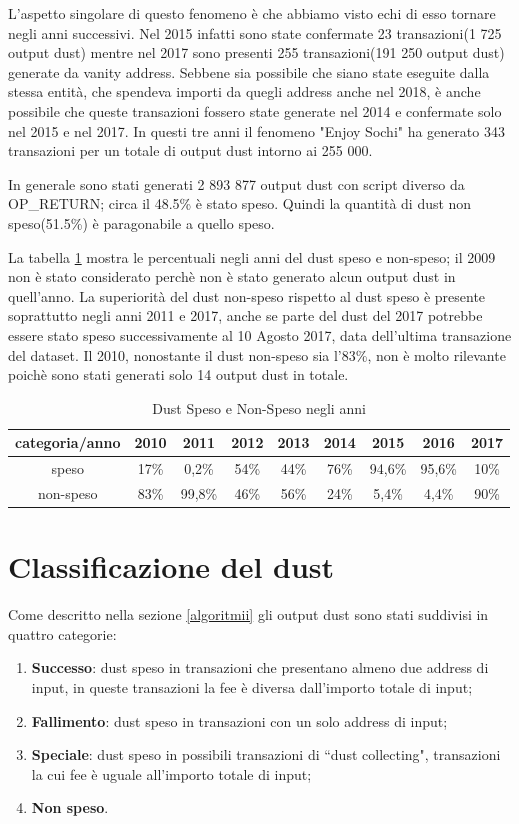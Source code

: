 L'aspetto singolare di questo fenomeno è che abbiamo visto echi di esso tornare negli anni successivi. Nel 2015 infatti sono state confermate 23 transazioni(1 725 output dust) mentre nel 2017 sono presenti 255 transazioni(191 250 output dust) generate da vanity address. Sebbene sia possibile che siano state eseguite dalla stessa entità, che spendeva importi da quegli address anche nel 2018, è anche possibile che queste transazioni fossero state generate nel 2014 e confermate solo nel 2015 e nel 2017. In questi tre anni il fenomeno "Enjoy Sochi" ha generato 343 transazioni per un totale di output dust intorno ai 255 000.

In generale sono stati generati 2 893 877 output dust con script diverso da OP\_RETURN; circa il 48.5\% è stato speso. Quindi la quantità di dust non speso(51.5\%) è paragonabile a quello speso. 

La tabella \ref{tab:dust_spent_unspent} mostra le percentuali negli anni del dust speso e non-speso; il 2009 non è stato considerato perchè non è stato generato alcun output dust in quell'anno. La superiorità del dust non-speso rispetto al dust speso è presente soprattutto negli anni 2011 e 2017, anche se parte del dust del 2017 potrebbe essere stato speso successivamente al 10 Agosto 2017, data dell'ultima transazione del dataset. Il 2010, nonostante il dust non-speso sia l'83\%, non è molto rilevante poichè sono stati generati solo 14 output dust in totale. 
\begin{table}[H]
    \centering
    \begin{tabular}{|c|c|c|c|c|c|c|c|c|}
        \hline
           categoria/anno   & 2010 & 2011 & 2012 & 2013 & 2014 & 2015 & 2016 & 2017\\
        \hline 
         speso &  17\% & 0,2\% & 54\% & 44\% & 76\% & 94,6\% & 95,6\% & 10\% \\
         \hline
         non-speso & 83\% & 99,8\% & 46\% & 56\% & 24\% & 5,4\% & 4,4\% & 90\%  \\
         \hline
    \end{tabular}
    \caption{Dust Speso e Non-Speso negli anni}
    \label{tab:dust_spent_unspent}
\end{table}
\section{Classificazione del dust}
Come descritto nella sezione \ref{algoritmii} gli output dust sono stati suddivisi in quattro categorie:
\begin{enumerate}
    \item \textbf{Successo}: dust speso in transazioni che presentano almeno due address di input, in queste transazioni la fee è diversa dall'importo totale di input;
    \item \textbf{Fallimento}: dust speso in transazioni con un solo address di input;
    \item \textbf{Speciale}: dust speso in possibili transazioni di ``dust collecting", transazioni la cui fee è uguale all'importo totale di input;
    \item \textbf{Non speso}.
\end{enumerate}

